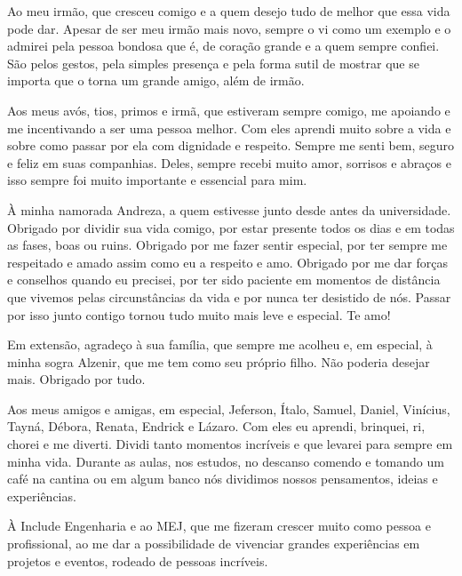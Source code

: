 \begin{trivlist}
  \item Ao meu irmão, que cresceu comigo e a quem desejo tudo de melhor que essa vida pode dar. Apesar de ser meu irmão mais novo, sempre o vi como um exemplo e o admirei pela pessoa bondosa que é, de coração grande e a quem sempre confiei. São pelos gestos, pela simples presença e pela forma sutil de mostrar que se importa que o torna um grande amigo, além de irmão.

  \item Aos meus avós, tios, primos e irmã, que estiveram sempre comigo, me apoiando e me incentivando a ser uma pessoa melhor. Com eles aprendi muito sobre a vida e sobre como passar por ela com dignidade e respeito. Sempre me senti bem, seguro e feliz em suas companhias. Deles, sempre recebi muito amor, sorrisos e abraços e isso sempre foi muito importante e essencial para mim.
  
  \item À minha namorada Andreza, a quem estivesse junto desde antes da universidade. Obrigado por dividir sua vida comigo, por estar presente todos os dias e em todas as fases, boas ou ruins. Obrigado por me fazer sentir especial, por ter sempre me respeitado e amado assim como eu a respeito e amo. Obrigado por me dar forças e conselhos quando eu precisei, por ter sido paciente em momentos de distância que vivemos pelas circunstâncias da vida e por nunca ter desistido de nós. Passar por isso junto contigo tornou tudo muito mais leve e especial. Te amo!

  \item Em extensão, agradeço à sua família, que sempre me acolheu e, em especial, à minha sogra Alzenir, que me tem como seu próprio filho. Não poderia desejar mais. Obrigado por tudo.
  
  \item Aos meus amigos e amigas, em especial, Jeferson, Ítalo, Samuel, Daniel, Vinícius, Tayná, Débora, Renata, Endrick e Lázaro. Com eles eu aprendi, brinquei, ri, chorei e me diverti. Dividi tanto momentos incríveis e que levarei para sempre em minha vida. Durante as aulas, nos estudos, no descanso comendo e tomando um café na cantina ou em algum banco nós dividimos nossos pensamentos, ideias e experiências.

  \item À Include Engenharia e ao MEJ, que me fizeram crescer muito como pessoa e profissional, ao me dar a possibilidade de vivenciar grandes experiências em projetos e eventos, rodeado de pessoas incríveis.


\end{trivlist}
